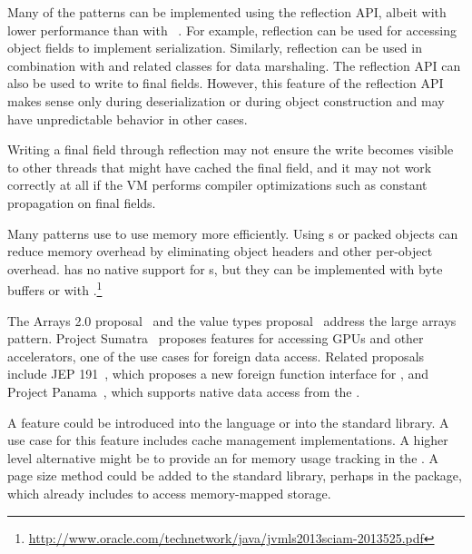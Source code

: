 
Many of the patterns can be implemented using the reflection API,
albeit with lower performance than with \unsafe{}~\citep{korlandNoninvasiveConcurrencyJava2010}.
For example,
reflection can be used for accessing object fields to implement serialization.
Similarly, reflection can be used
in combination with
 and related classes for
data marshaling.
The reflection API can also be used to write to final fields.
However, this feature of the reflection API 
makes sense only during deserialization or during object construction and may have
unpredictable behavior in other cases.


Writing a final field through reflection may not ensure
the write becomes visible to other threads that might have cached the final
field, and it may not work correctly at all if the VM performs compiler
optimizations such as constant propagation on final fields.

Many patterns use \unsafe{} to use memory more efficiently.
Using s or packed objects can reduce memory overhead by eliminating object headers and other per-object overhead.
\java{} has no native support for s,
but they can be implemented with byte buffers or with \jni{}.\footnote{\url{http://www.oracle.com/technetwork/java/jvmls2013sciam-2013525.pdf}}

The Arrays 2.0 proposal~\citep{arrays20} and
the value types proposal~\citep{valuetypes} address the large arrays pattern.
Project Sumatra~\citep{layouts} proposes features for accessing GPUs
and other accelerators,
one of the use cases for foreign data access.
Related proposals include JEP 191~\citep{jep191},
which proposes a new foreign function interface for \java{},
and Project Panama~\citep{panama}, which supports native data access from the \jvm{}.

A  feature could be introduced into the language or into the standard library.
A use case for this feature includes cache management implementations.
A higher level alternative might be to provide an \api{} for memory usage tracking in the \jvm{}.
A page size method could be added to the standard library,
perhaps in the  package,
which already includes  to access memory-mapped storage.


